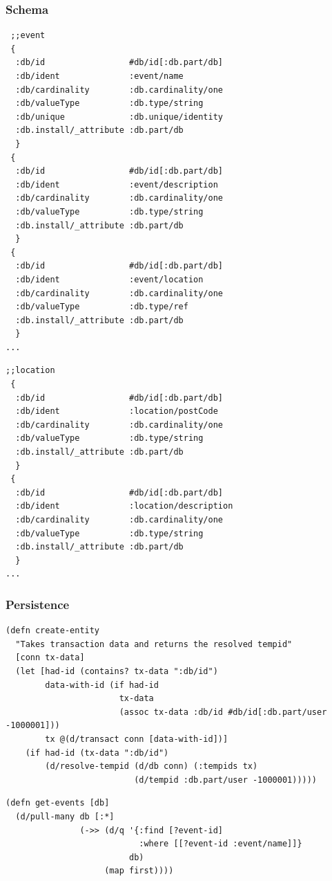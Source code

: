 \documentclass[11pt]{article}
\begin{document}
\subsubsection*{Schema}
\label{sec:orgheadline25}

\begin{verbatim}
 ;;event
 {
  :db/id                 #db/id[:db.part/db]
  :db/ident              :event/name
  :db/cardinality        :db.cardinality/one
  :db/valueType          :db.type/string
  :db/unique             :db.unique/identity
  :db.install/_attribute :db.part/db
  }
 {
  :db/id                 #db/id[:db.part/db]
  :db/ident              :event/description
  :db/cardinality        :db.cardinality/one
  :db/valueType          :db.type/string
  :db.install/_attribute :db.part/db
  }
 {
  :db/id                 #db/id[:db.part/db]
  :db/ident              :event/location
  :db/cardinality        :db.cardinality/one
  :db/valueType          :db.type/ref
  :db.install/_attribute :db.part/db
  }
...
\end{verbatim}
\begin{verbatim}
;;location
 {
  :db/id                 #db/id[:db.part/db]
  :db/ident              :location/postCode
  :db/cardinality        :db.cardinality/one
  :db/valueType          :db.type/string
  :db.install/_attribute :db.part/db
  }
 {
  :db/id                 #db/id[:db.part/db]
  :db/ident              :location/description
  :db/cardinality        :db.cardinality/one
  :db/valueType          :db.type/string
  :db.install/_attribute :db.part/db
  }
...
\end{verbatim}
\subsubsection*{Persistence}
\label{sec:orgheadline26}

\begin{verbatim}
(defn create-entity
  "Takes transaction data and returns the resolved tempid"
  [conn tx-data]
  (let [had-id (contains? tx-data ":db/id")
        data-with-id (if had-id
                       tx-data
                       (assoc tx-data :db/id #db/id[:db.part/user -1000001]))
        tx @(d/transact conn [data-with-id])]
    (if had-id (tx-data ":db/id")
        (d/resolve-tempid (d/db conn) (:tempids tx)
                          (d/tempid :db.part/user -1000001)))))
\end{verbatim}
\begin{verbatim}
(defn get-events [db]
  (d/pull-many db [:*]
               (->> (d/q '{:find [?event-id]
                           :where [[?event-id :event/name]]}
                         db)
                    (map first))))
\end{verbatim}
\end{document}
